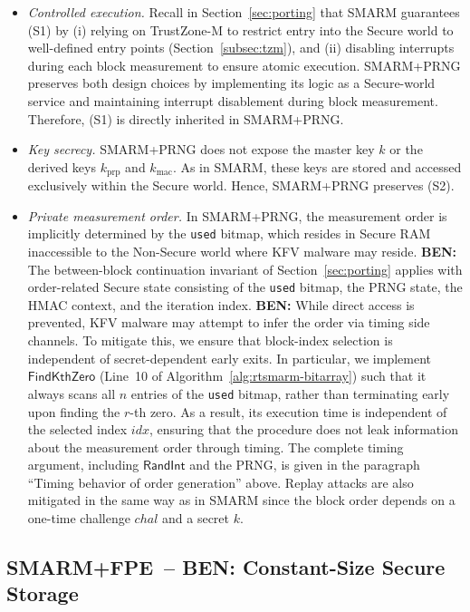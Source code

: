 \documentclass{ieeeaccess}
\DeclareRobustCommand{\ben}[1]{{\color{BENcolor}\textbf{BEN:} #1}}
\newcommand{\rtsmarmone}{SMARM+PRNG\xspace}
\newcommand{\rtsmarmtwo}{SMARM+FPE\xspace}
\begin{document}
\begin{itemize}
  \item[(S1)] \emph{Controlled execution.}
  Recall in Section~\ref{sec:porting} that SMARM guarantees (S1) by (i) relying on TrustZone-M to restrict entry into the Secure world to well-defined entry points (Section~\ref{subsec:tzm}), and (ii) disabling interrupts during each block measurement to ensure atomic execution.
  \rtsmarmone preserves both design choices by implementing its logic as a Secure-world service and maintaining interrupt disablement during block measurement.
  Therefore, (S1) is directly inherited in \rtsmarmone.

  \item[(S2)] \emph{Key secrecy.}
  \rtsmarmone does not expose the master key $k$ or the derived keys $k_{\mathrm{prp}}$ and $k_{\mathrm{mac}}$.
  As in SMARM, these keys are stored and accessed exclusively within the Secure world.
  Hence, \rtsmarmone preserves (S2).

  \item[(S3)] \emph{Private measurement order.}
  In \rtsmarmone, the measurement order is implicitly determined by the \texttt{used} bitmap, which resides in Secure RAM inaccessible to the Non-Secure world where KFV malware may reside.
  \ben{The between-block continuation invariant of Section~\ref{sec:porting} applies with order-related Secure state consisting of the \texttt{used} bitmap, the PRNG state, the HMAC context, and the iteration index.}
  \ben{While direct access is prevented, KFV malware may attempt to infer the order via timing side channels.
  To mitigate this, we ensure that block-index selection is independent of secret-dependent early exits.
  In particular, we implement $\mathsf{FindKthZero}$ (Line~10 of Algorithm~\ref{alg:rtsmarm-bitarray}) such that it always scans all $n$ entries of the \texttt{used} bitmap, rather than terminating early upon finding the $r$-th zero.
  As a result, its execution time is independent of the selected index $idx$, ensuring that the procedure does not leak information about the measurement order through timing.
  The complete timing argument, including $\mathsf{RandInt}$ and the PRNG, is given in the paragraph ``Timing behavior of order generation'' above.}
  Replay attacks are also mitigated in the same way as in SMARM since the block order depends on a one-time challenge $chal$ and a secret $k$.
\end{itemize}



\subsection{\rtsmarmtwo\ -- \ben{Constant-Size Secure Storage}}
\label{sec:rtsmarm-fpe}
\end{document}
